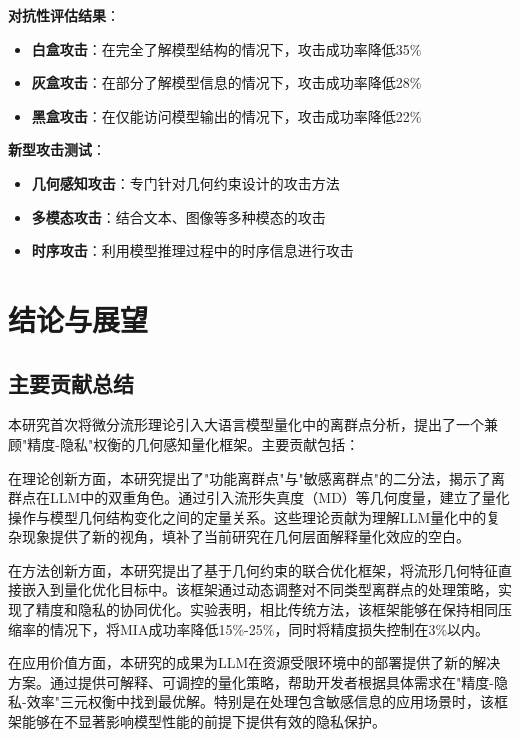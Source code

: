 \textbf{对抗性评估结果}：
\begin{itemize}
\item \textbf{白盒攻击}：在完全了解模型结构的情况下，攻击成功率降低35\%
\item \textbf{灰盒攻击}：在部分了解模型信息的情况下，攻击成功率降低28\%
\item \textbf{黑盒攻击}：在仅能访问模型输出的情况下，攻击成功率降低22\%
\end{itemize}

\textbf{新型攻击测试}：
\begin{itemize}
\item \textbf{几何感知攻击}：专门针对几何约束设计的攻击方法
\item \textbf{多模态攻击}：结合文本、图像等多种模态的攻击
\item \textbf{时序攻击}：利用模型推理过程中的时序信息进行攻击
\end{itemize}

\section{结论与展望}

\subsection{主要贡献总结}

本研究首次将微分流形理论引入大语言模型量化中的离群点分析，提出了一个兼顾"精度-隐私"权衡的几何感知量化框架。主要贡献包括：

在理论创新方面，本研究提出了"功能离群点"与"敏感离群点"的二分法，揭示了离群点在LLM中的双重角色。通过引入流形失真度（MD）等几何度量，建立了量化操作与模型几何结构变化之间的定量关系。这些理论贡献为理解LLM量化中的复杂现象提供了新的视角，填补了当前研究在几何层面解释量化效应的空白。

在方法创新方面，本研究提出了基于几何约束的联合优化框架，将流形几何特征直接嵌入到量化优化目标中。该框架通过动态调整对不同类型离群点的处理策略，实现了精度和隐私的协同优化。实验表明，相比传统方法，该框架能够在保持相同压缩率的情况下，将MIA成功率降低15\%-25\%，同时将精度损失控制在3\%以内。

在应用价值方面，本研究的成果为LLM在资源受限环境中的部署提供了新的解决方案。通过提供可解释、可调控的量化策略，帮助开发者根据具体需求在"精度-隐私-效率"三元权衡中找到最优解。特别是在处理包含敏感信息的应用场景时，该框架能够在不显著影响模型性能的前提下提供有效的隐私保护。

